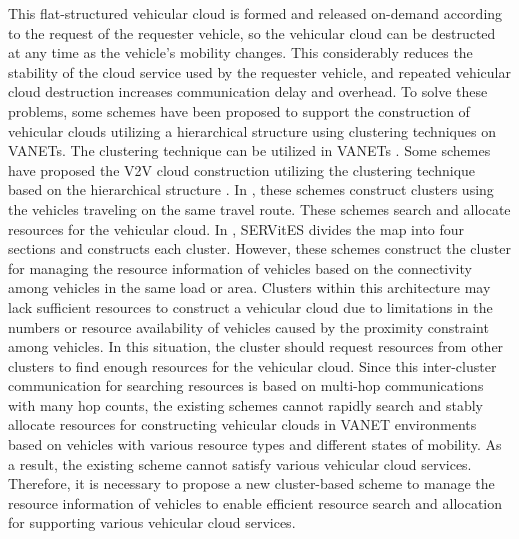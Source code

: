 \documentclass[sensors,article,accept,moreauthors,pdftex]{Definitions/mdpi}
\begin{document}
This flat-structured vehicular cloud is formed and released on-demand according to the request of the requester vehicle, so the vehicular cloud can be destructed at any time as the vehicle's mobility changes. This considerably reduces the stability of the cloud service used by the requester vehicle, and repeated vehicular cloud destruction increases communication delay and overhead.
To solve these problems, some schemes have been proposed to support the construction of vehicular clouds utilizing a hierarchical structure using clustering techniques on VANETs.
The clustering technique can be utilized in VANETs \cite{Zhang2011, Arkian2014, Meneguette2017a, Zhang2019, Wu2019, Meneguette2019, Kokare2021, Zhang2020a, Alabbas2020, Tan2019, Katiyar2020, Jalooli2020}.
Some schemes have proposed the V2V cloud construction utilizing the clustering technique based on the hierarchical \linebreak  structure \cite{Zhang2011, Meneguette2017a, Meneguette2019}.
In \cite{Zhang2011, Arkian2014, Zhang2019}, these schemes construct clusters using the vehicles traveling on the same travel route. These schemes search and allocate resources for the vehicular cloud. In \cite{Meneguette2017a}, SERVitES divides the map into four sections and constructs each cluster. However, these schemes construct the cluster for managing the resource information of vehicles based on the connectivity among vehicles in the same load or area. Clusters within this architecture may lack sufficient resources to construct a vehicular cloud due to limitations in the numbers or resource availability of vehicles caused by the proximity constraint among vehicles. In this situation, the cluster should request resources from other clusters to find enough resources for the vehicular cloud. Since this inter-cluster communication for searching resources is based on multi-hop communications with many hop counts, the existing schemes cannot rapidly search and stably allocate resources for constructing vehicular clouds in VANET environments based on vehicles with various resource types and different states of mobility. As a result, the existing scheme cannot satisfy various vehicular cloud services. Therefore, it is necessary to propose a new cluster-based scheme to manage the resource information of vehicles to enable efficient resource search and allocation for supporting various vehicular cloud services.
\end{document}
